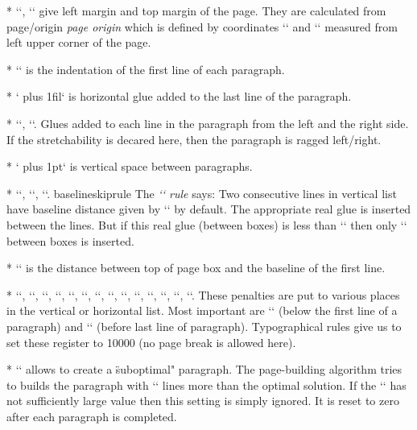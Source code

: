 {* \y`\hoffset=0pt`,
  \y`\voffset=0pt` give left margin and top margin of the page. They are
  calculated from \ii page/origin {\em page origin} which is defined by coordinates
  \y`\pdfvorigin=1in` and \y`\pdfhorigin=1in` measured from left upper corner of
  the page.

* \y`\parindent=20pt` is the indentation of the first line of each paragraph.

* \y`\parfillskip=0pt plus 1fil` is horizontal glue added to the last line of the
  paragraph.

* \y`\leftskip=0pt`, \y`\rightskip=0pt`. Glues added to each line in the
  paragraph from the left and the right side. If the stretchability is decared here,
  then the paragraph is ragged left/right.

* \y`\parskip=0pt plus 1pt` is vertical space between paragraphs.

* \y`\baselineskip=12pt`,
  \y`\lineskiplimit=0pt`,
  \y`\lineskip=1pt`.
  \ii baselineskiprule The {\em `\baselineskip` rule} says: 
  Two consecutive lines in vertical list have baseline distance given 
  by \x`\baselineskip` by default. The appropriate real glue is inserted
  between the lines.
  But if this real glue (between boxes) is less than \x`\lineskiplimit` 
  then only \x`\lineskip` between boxes is inserted.

* \y`\topskip=10pt` is the distance between top of page box and the baseline of
  the first line.

* \y``,
  \y``,
  \y``,
  \y``,
  \y``,
  \y``,
  \y``,
  \y``,
  \y``,
  \y``,
  \y``,
  \y``,
  \y``,
  \y``.
  These penalties are put to various places in the vertical or horizontal
  list. Most important are \x`\clubpenalty` (below the first line of a paragraph)
  and \x`\widowpenalty` (before last line of paragraph). Typographical rules
  give us to set these register to 10000 (no page break is allowed here).

* \y`` allows to create a \"suboptimal" paragraph. The page-building
  algorithm tries to builds the paragraph with \x`\loosenes` lines more than
  the optimal solution. If the \x`\tolerance` has not sufficiently large value
  then this setting is simply ignored. It is reset to zero after each
  paragraph is completed.

}
